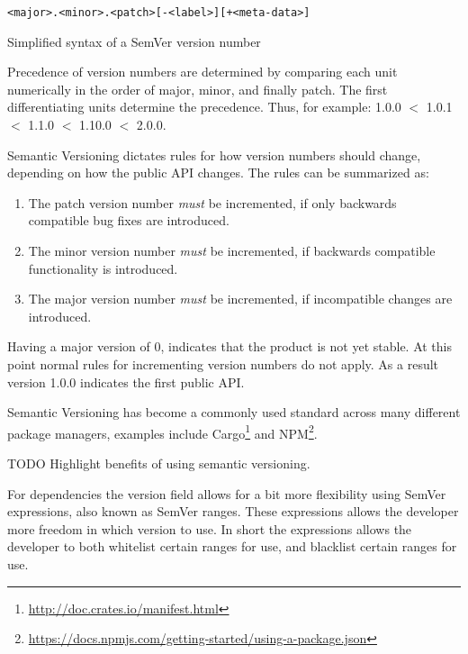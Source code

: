 \begin{listing}[H]
\begin{verbatim}
<major>.<minor>.<patch>[-<label>][+<meta-data>]
\end{verbatim}
\caption{Simplified syntax of a SemVer version number}
\label{lst:semver_syntax}
\end{listing}

Precedence of version numbers are determined by comparing each unit numerically
in the order of major, minor, and finally patch. The first differentiating
units determine the precedence. Thus, for example: 1.0.0 $<$ 1.0.1 $<$ 1.1.0
$<$ 1.10.0 $<$ 2.0.0.

Semantic Versioning dictates rules for how version numbers should change,
depending on how the public API changes. The rules can be summarized as:

\begin{enumerate}

    \item The patch version number \emph{must} be incremented, if only
        backwards compatible bug fixes are introduced.

    \item The minor version number \emph{must} be incremented, if backwards
        compatible functionality is introduced.

    \item The major version number \emph{must} be incremented, if incompatible
        changes are introduced.

\end{enumerate}

Having a major version of 0, indicates that the product is not yet stable. At
this point normal rules for incrementing version numbers do not apply. As a
result version 1.0.0 indicates the first public API.

Semantic Versioning has become a commonly used standard across many different
package managers, examples include
Cargo\footnote{\url{http://doc.crates.io/manifest.html}} and
NPM\footnote{\url{https://docs.npmjs.com/getting-started/using-a-package.json}}.

TODO Highlight benefits of using semantic versioning.


For dependencies the version field allows for a bit more flexibility using
SemVer expressions, also known as SemVer ranges. These expressions allows the
developer more freedom in which version to use. In short the expressions allows
the developer to both whitelist certain ranges for use, and blacklist certain
ranges for use.

